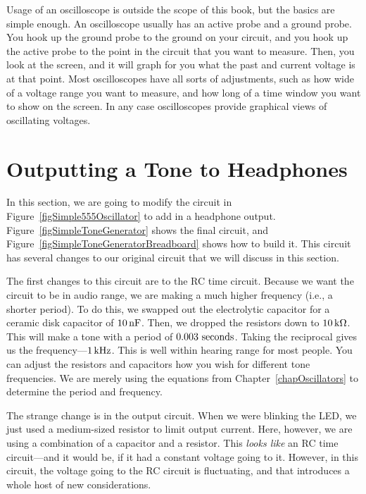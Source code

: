 Usage of an oscilloscope is outside the scope of this book, but the basics are simple enough.
An oscilloscope usually has an active probe and a ground probe.
You hook up the ground probe to the ground on your circuit, and you hook up the active probe to the point in the circuit that you want to measure.
Then, you look at the screen, and it will graph for you what the past and current voltage is at that point.
Most oscilloscopes have all sorts of adjustments, such as how wide of a voltage range you want to measure, and how long of a time window you want to show on the screen.
In any case oscilloscopes provide graphical views of oscillating voltages.

\section{Outputting a Tone to Headphones}

In this section, we are going to modify the circuit in Figure~\ref{figSimple555Oscillator} to add in a headphone output.
Figure~\ref{figSimpleToneGenerator} shows the final circuit, and Figure~\ref{figSimpleToneGeneratorBreadboard} shows how to build it.
This circuit has several changes to our original circuit that we will discuss in this section.



The first changes to this circuit are to the RC time circuit.
Because we want the circuit to be in audio range, we are making a much higher frequency (i.e., a shorter period).
To do this, we swapped out the electrolytic capacitor for a ceramic disk capacitor of $10\,\si{\nano\farad}$.  
Then, we dropped the resistors down to $10\,\si{\kilo\ohm}$.
This will make a tone with a period of $0.003\textrm{ seconds}$.
Taking the reciprocal gives us the frequency---$1\,\si{\kilo\hertz}$.
This is well within hearing range for most people.
You can adjust the resistors and capacitors how you wish for different tone frequencies.
We are merely using the equations from Chapter~\ref{chapOscillators} to determine the period and frequency.

The strange change is in the output circuit.
When we were blinking the LED, we just used a medium-sized resistor to limit output current.
Here, however, we are using a combination of a capacitor and a resistor.
This \emph{looks like} an RC time circuit---and it would be, if it had a constant voltage going to it.
However, in this circuit, the voltage going to the RC circuit is fluctuating, and that introduces a whole host of new considerations.

